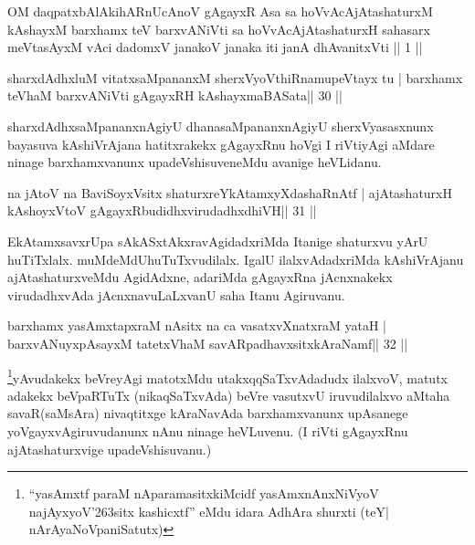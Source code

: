 
\begin{kandikeshl}
OM daqpatxbAlAkihARnUcAnoV gAgayxR Asa
sa hoVvAcAjAtashaturxM kAshayxM barxhamx teV barxvANiVti
sa hoVvAcAjAtashaturxH sahasarx meVtasAyxM vAci
dadomxV janakoV janaka iti janA dhAvanitxVti || 1 ||
\end{kandikeshl}

\begin{shl}
sharxdAdhxluM vitatxsaMpananxM sherxVyoVthiRnamupeVtayx tu |
barxhamx teV\s haM barxvANiVti gAgayxRH kAshayxmaBASata\hfill || 30 ||
\end{shl}

\begin{artha}
sharxdAdhxsaMpananxnAgiyU dhanasaMpananxnAgiyU sherxVyasasxnunx bayasuva kAshiVrAjana hatitxrakekx gAgayxRnu hoVgi I riVtiyAgi aMdare ninage barxhamxvanunx upadeVshisuveneMdu avanige heVLidanu.
\end{artha}


\begin{shl}
na jAtoV na BaviSoyxV\s sitx shaturxreYkAtamxyXdashaRnAtf |
ajAtashaturxH kAshoyxV\s toV gAgayxRbudidhxvirudadhxdhiVH\hfill || 31 ||
\end{shl}

\begin{artha}
EkAtamxsavxrUpa sAkASxtAkxravAgidadxriMda Itanige shaturxvu yArU huTiTxlalx. muMdeMdUhuTuTxvudilalx. IgalU ilalxvAdadxriMda kAshiVrAjanu ajAtashaturxveMdu AgidAdxne, adariMda gAgayxRna jAcnxnakekx virudadhxvAda jAcnxnavuLaLxvanU saha Itanu Agiruvanu.
\end{artha}

\begin{shl}
barxhamx yasAmxtapxraM nAsitx na ca vasatxvXnatxraM yataH |
barxvANuyxpAsayxM tatetxV\s haM savARpadhavxsitxkAraNamf\hfill || 32 ||
\end{shl}

\begin{artha}
\footnote{``yasAmxtf paraM nAparamasitxkiMcidf yasAmxnAnxNiVyoV 
najAyxyoV\char'263sitx kashicxtf'' eMdu idara AdhAra shurxti (teY| 
nArAyaNoVpaniSatutx)}yAvudakekx beVreyAgi matotxMdu utakxqqSaTxvAdadudx ilalxvoV, matutx adakekx beVpaRTuTx (nikaqSaTxvAda) beVre vasutxvU iruvudilalxvo aMtaha savaR(saMsAra) nivaqtitxge kAraNavAda barxhamxvanunx upAsanege yoVgayxvAgiruvudanunx nAnu ninage heVLuvenu. (I riVti gAgayxRnu ajAtashaturxvige upadeVshisuvanu.)
\end{artha}

